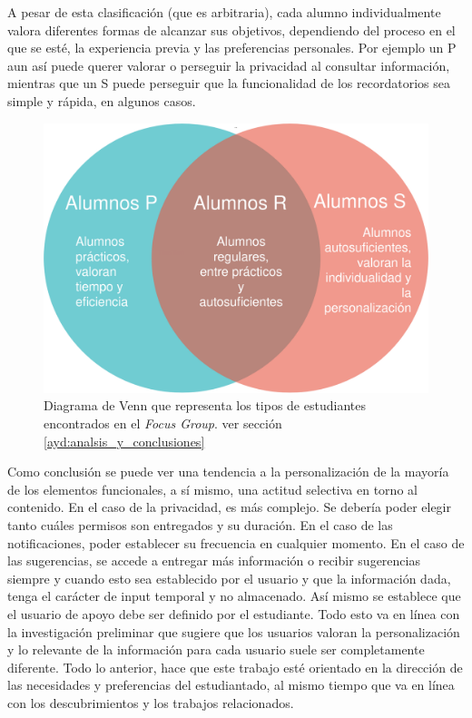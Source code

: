     \par A pesar de esta clasificación (que es arbitraria), cada alumno individualmente valora diferentes formas de alcanzar sus objetivos, dependiendo del proceso en el que se esté, la experiencia previa y las preferencias personales. Por ejemplo un \acrshort{P} aun así puede querer valorar o perseguir la privacidad al consultar información, mientras que un \acrshort{S} puede perseguir que la funcionalidad de los recordatorios sea simple y rápida, en algunos casos.

    \begin{figure}[h]
        \centering
        \includegraphics[scale=0.2]{media/imagenes/focus_groups/Tipos_de_alumnos-Diagrama_de_Venn.png}
        \caption[Diagrama Tipos de alumnos]{Diagrama de Venn que representa los tipos de estudiantes encontrados en el \textit{Focus Group}. ver sección \ref{ayd:analsis_y_conclusiones}}
        \label{fig:alumnosVenn}
    \end{figure}

    \par Como conclusión se puede ver una tendencia a la personalización de la mayoría de los elementos funcionales, a sí mismo, una actitud selectiva en torno al contenido. En el caso de la privacidad, es más complejo. Se debería poder elegir tanto cuáles permisos son entregados y su duración. En el caso de las notificaciones, poder establecer su frecuencia en cualquier momento. En el caso de las sugerencias, se accede a entregar más información o recibir sugerencias siempre y cuando esto sea establecido por el usuario y que la información dada, tenga el carácter de input temporal y no almacenado. Así mismo se establece que el usuario de apoyo debe ser definido por el estudiante. Todo esto va en línea con la investigación preliminar que sugiere que los usuarios valoran la personalización y lo relevante de la información para cada usuario suele ser completamente diferente. Todo lo anterior, hace que este trabajo esté orientado en la dirección de las necesidades y preferencias del estudiantado, al mismo tiempo que va en línea con los descubrimientos y los trabajos relacionados.

